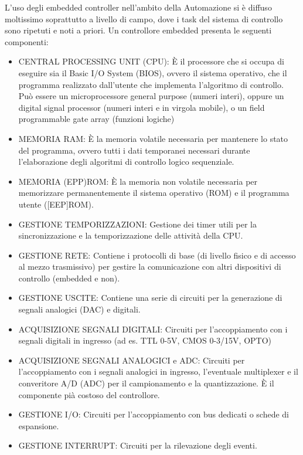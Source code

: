 \documentclass[10pt, letterpaper]{report}
\begin{document}
L'uso degli embedded controller nell'ambito della Automazione si è diffuso moltissimo
soprattutto a livello di campo, dove i task del sistema di controllo sono ripetuti e noti
a priori. Un controllore embedded presenta le seguenti componenti:\begin{itemize}
    \item CENTRAL PROCESSING UNIT (CPU):
    È il processore che si occupa di eseguire sia il Basic I/O System (BIOS), ovvero il
    sistema operativo, che il programma realizzato dall'utente che implementa
    l'algoritmo di controllo.  Può essere un microprocessore general purpose (numeri interi), oppure
    un digital signal processor (numeri interi e in virgola mobile), o un field
    programmable gate array (funzioni logiche) 
    \item MEMORIA RAM:
    È la memoria volatile necessaria per mantenere lo stato del programma, ovvero
    tutti i dati temporanei necessari durante l'elaborazione degli algoritmi di controllo
    logico sequenziale.
    \item MEMORIA (EPP)ROM:
    È la memoria non volatile necessaria per memorizzare permanentemente il
    sistema operativo (ROM) e il programma utente ([EEP]ROM).
    \item GESTIONE TEMPORIZZAZIONI:
    Gestione dei timer utili per la sincronizzazione e la temporizzazione delle attività
    della CPU.
    \item GESTIONE RETE:
    Contiene i protocolli di base (di livello fisico e di accesso al mezzo trasmissivo) per
    gestire la comunicazione con altri dispositivi di controllo (embedded e non).
    \item GESTIONE USCITE:
Contiene una serie di circuiti per la generazione di segnali analogici (DAC) e
digitali.
\item ACQUISIZIONE SEGNALI DIGITALI:
Circuiti per l'accoppiamento con i segnali digitali in ingresso (ad es. TTL 0-5V,
CMOS 0-3/15V, OPTO)
    \item ACQUISIZIONE SEGNALI ANALOGICI e ADC:
    Circuiti per l'accoppiamento con i segnali analogici in ingresso, l'eventuale
    multiplexer e il converitore A/D (ADC) per il campionamento e la
    quantizzazione. È il componente pià costoso del controllore.
    \item GESTIONE I/O:
    Circuiti per l'accoppiamento con bus dedicati o schede di espansione.
    \item GESTIONE INTERRUPT:
    Circuiti per la rilevazione degli eventi.
\end{itemize}
\end{document}
